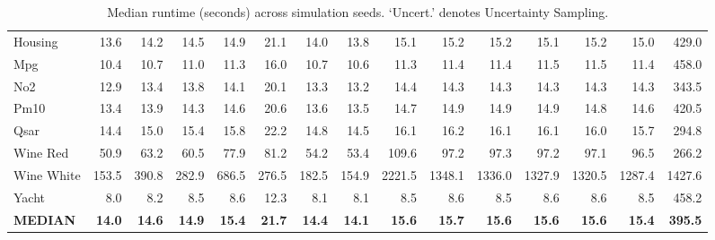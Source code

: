\begin{table}[htbp]
\begin{tabular}{l rrrrrrrrrrrrrr}
        Housing & 13.6 & 14.2 & 14.5 & 14.9 & 21.1 & 14.0 & 13.8 & 15.1 & 15.2 & 15.2 & 15.1 & 15.2 & 15.0 & 429.0 \\
        Mpg & 10.4 & 10.7 & 11.0 & 11.3 & 16.0 & 10.7 & 10.6 & 11.3 & 11.4 & 11.4 & 11.5 & 11.5 & 11.4 & 458.0 \\
        No2 & 12.9 & 13.4 & 13.8 & 14.1 & 20.1 & 13.3 & 13.2 & 14.4 & 14.3 & 14.3 & 14.3 & 14.3 & 14.3 & 343.5 \\
        Pm10 & 13.4 & 13.9 & 14.3 & 14.6 & 20.6 & 13.6 & 13.5 & 14.7 & 14.9 & 14.9 & 14.9 & 14.8 & 14.6 & 420.5 \\
        Qsar & 14.4 & 15.0 & 15.4 & 15.8 & 22.2 & 14.8 & 14.5 & 16.1 & 16.2 & 16.1 & 16.1 & 16.0 & 15.7 & 294.8 \\
        Wine Red & 50.9 & 63.2 & 60.5 & 77.9 & 81.2 & 54.2 & 53.4 & 109.6 & 97.2 & 97.3 & 97.2 & 97.1 & 96.5 & 266.2 \\
        Wine White & 153.5 & 390.8 & 282.9 & 686.5 & 276.5 & 182.5 & 154.9 & 2221.5 & 1348.1 & 1336.0 & 1327.9 & 1320.5 & 1287.4 & 1427.6 \\
        Yacht & 8.0 & 8.2 & 8.5 & 8.6 & 12.3 & 8.1 & 8.1 & 8.5 & 8.6 & 8.5 & 8.6 & 8.6 & 8.5 & 458.2 \\
        \textbf{MEDIAN} & \textbf{14.0} & \textbf{14.6} & \textbf{14.9} & \textbf{15.4} & \textbf{21.7} & \textbf{14.4} & \textbf{14.1} & \textbf{15.6} & \textbf{15.7} & \textbf{15.6} & \textbf{15.6} & \textbf{15.6} & \textbf{15.4} & \textbf{395.5} \\
        \bottomrule
    \end{tabular}
    \caption{Median runtime (seconds) across simulation seeds. `Uncert.' denotes Uncertainty Sampling.}
    \label{tab:RuntimeComparison}
\end{table}
